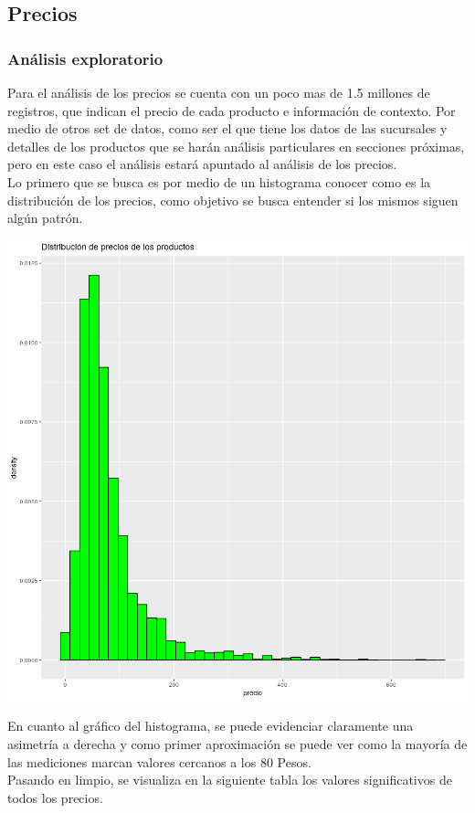 \subsection{Precios}
\subsubsection{Análisis exploratorio}

Para el análisis de los precios se cuenta con un poco mas de 1.5 millones de registros, que indican el precio de cada producto e información de contexto. Por medio de otros set de datos, como ser el que tiene los datos de las sucursales y detalles de los productos que se harán análisis particulares en secciones próximas, pero en este caso el análisis estará apuntado al análisis de los precios.\\

Lo primero que se busca es por medio de un histograma conocer como es la distribución de los precios, como objetivo se busca entender si los mismos siguen algún patrón.\\


\begin{center}
    \includegraphics[scale=0.6]{img/histograma_precios_productos.png}
\end{center}

En cuanto al gráfico del histograma, se puede evidenciar claramente una asimetría a derecha y como primer
aproximación se puede ver como la mayoría de las mediciones marcan valores cercanos a los 80 Pesos.\\
Pasando en limpio, se visualiza en la siguiente tabla los valores significativos de todos los precios.\\

